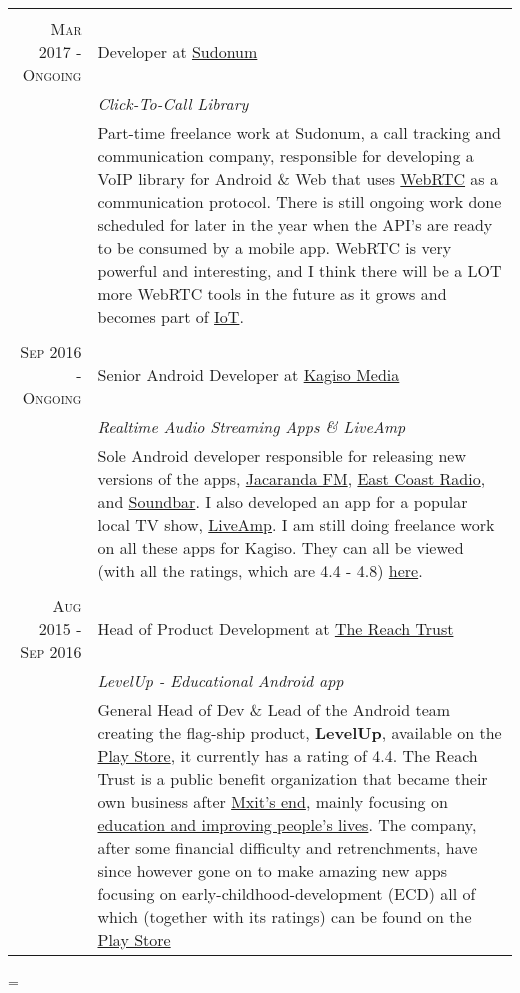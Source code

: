 \documentclass[a4paper,10pt,notitlepage]{article}
\newenvironment{absolutelynopagebreak}
  {\par\nobreak\vfil\penalty0\vfilneg
   \vtop\bgroup}
  {\par\xdef\tpd{\the\prevdepth}\egroup
   \prevdepth=\tpd}
\begin{document}
\begin{absolutelynopagebreak}
\begin{tabular}{r|p{11cm}}
\multicolumn{2}{c}{} \\
\textsc{Mar 2017 - Ongoing} & Developer at \href{www.sudonum.com}{Sudonum} \\&\emph{Click-To-Call Library}\\&\footnotesize{Part-time freelance work at Sudonum, a call tracking and communication company, responsible for developing a VoIP library for Android \& Web that uses \href{https://en.wikipedia.org/wiki/WebRTC}{WebRTC} as a communication protocol. There is still ongoing work done scheduled for later in the year when the API's are ready to be consumed by a mobile app. WebRTC is very powerful and interesting, and I think there will be a LOT more WebRTC tools in the future as it grows and becomes part of \href{https://en.wikipedia.org/wiki/Internet_of_things}{IoT}.} \\

\multicolumn{2}{c}{} \\
\textsc{Sep 2016 - Ongoing} & Senior Android Developer at \href{www.kagisomedia.co.za}{Kagiso Media} \\&\emph{Realtime Audio Streaming Apps \& LiveAmp}\\&\footnotesize{Sole Android developer responsible for releasing new versions of the apps, \href{https://play.google.com/store/apps/details?id=com.kagiso.jacarandafm}{Jacaranda FM},  \href{https://play.google.com/store/apps/details?id=com.kagiso.ecr}{East Coast Radio}, and \href{https://play.google.com/store/apps/details?id=com.kagiso.soundbar}{Soundbar}. I also developed an app for a popular local TV show, \href{https://play.google.com/store/apps/details?id=com.kagiso.liveamp}{LiveAmp}. I am still doing freelance work on all these apps for Kagiso. They can all be viewed (with all the ratings, which are 4.4 - 4.8) \href{https://play.google.com/store/apps/developer?id=Kagiso+Media}{here}}. \\

 \multicolumn{2}{c}{} \\
 \textsc{Aug 2015 - Sep 2016} & Head of Product Development at \href{www.thereachtrust.org}{The Reach Trust} \\&\emph{LevelUp -  Educational Android app}\\&\footnotesize{General Head of Dev \& Lead of the Android team creating the  flag-ship product, \textbf{LevelUp}, available on the \href{https://play.google.com/store/apps/details?id=org.mylevelup}{Play Store}, it currently has a rating of 4.4. The Reach Trust is a public benefit organization that became their own business after \href{https://memeburn.com/2015/10/mxit-confirms-its-shutting-up-shop/}{Mxit's end}, mainly focusing on \href{https://it-online.co.za/2015/10/26/reach-trust-will-use-mxit-for-education/}{education and improving people's lives}. The company, after some financial difficulty and retrenchments, have since however gone on to make amazing new apps focusing on early-childhood-development (ECD) all of which (together with its ratings) can be found on the \href{https://play.google.com/store/apps/dev?id=7356513661681471434}{Play Store}} \\
 

\end{tabular}
\end{absolutelynopagebreak}
\end{document}
